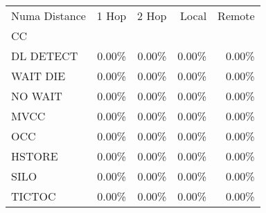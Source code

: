 \begin{tabular}{lrrrr}
\toprule
Numa Distance &  1 Hop &  2 Hop &  Local &  Remote \\
CC        &        &        &        &         \\
\midrule
DL DETECT &  0.00\% &  0.00\% &  0.00\% &   0.00\% \\
WAIT DIE  &  0.00\% &  0.00\% &  0.00\% &   0.00\% \\
NO WAIT   &  0.00\% &  0.00\% &  0.00\% &   0.00\% \\
MVCC      &  0.00\% &  0.00\% &  0.00\% &   0.00\% \\
OCC       &  0.00\% &  0.00\% &  0.00\% &   0.00\% \\
HSTORE    &  0.00\% &  0.00\% &  0.00\% &   0.00\% \\
SILO      &  0.00\% &  0.00\% &  0.00\% &   0.00\% \\
TICTOC    &  0.00\% &  0.00\% &  0.00\% &   0.00\% \\
\bottomrule
\end{tabular}
